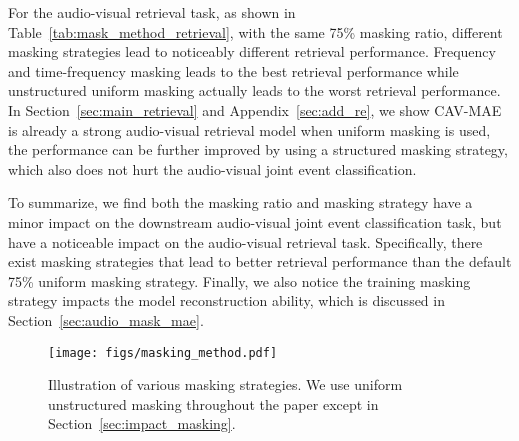 \documentclass{article} \usepackage{iclr2023_conference,times}
\begin{document}
For the audio-visual retrieval task, as shown in Table~\ref{tab:mask_method_retrieval}, with the same 75\% masking ratio, different masking strategies lead to noticeably different retrieval performance. Frequency and time-frequency masking leads to the best retrieval performance while unstructured uniform masking actually leads to the worst retrieval performance. In Section~\ref{sec:main_retrieval} and Appendix~\ref{sec:add_re}, we show CAV-MAE is already a strong audio-visual retrieval model when uniform masking is used, the performance can be further improved by using a structured masking strategy, which also does not hurt the audio-visual joint event classification. 

To summarize, we find both the masking ratio and masking strategy have a minor impact on the downstream audio-visual joint event classification task, but have a noticeable impact on the audio-visual retrieval task. Specifically, there exist masking strategies that lead to better retrieval performance than the default 75\% uniform masking strategy. Finally, we also notice the training masking strategy impacts the model reconstruction ability, which is discussed in Section~\ref{sec:audio_mask_mae}.

\begin{figure}[h]
\centering
\texttt{[image: figs/masking\_method.pdf]}
\caption{Illustration of various masking strategies. We use uniform unstructured masking throughout the paper except in Section~\ref{sec:impact_masking}.}
\label{fig:masking_method}
\end{figure}
\end{document}
